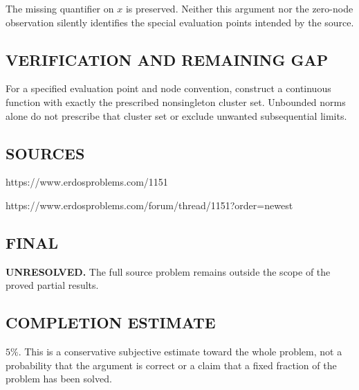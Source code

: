 The missing quantifier on $x$ is preserved. Neither this argument nor the zero-node
observation silently identifies the special evaluation points intended by the source.

\subsection*{VERIFICATION AND REMAINING GAP}
For a specified evaluation point and node convention, construct a continuous
function with exactly the prescribed nonsingleton cluster set. Unbounded norms
alone do not prescribe that cluster set or exclude unwanted subsequential limits.

\subsection*{SOURCES}
https://www.erdosproblems.com/1151

https://www.erdosproblems.com/forum/thread/1151?order=newest

\subsection*{FINAL}
\textbf{UNRESOLVED.} The full source problem remains outside the scope of the proved partial results.

\subsection*{COMPLETION ESTIMATE}
$5\%$. This is a conservative subjective estimate toward the whole problem, not a probability that the argument is correct or a claim that a fixed fraction of the problem has been solved.
